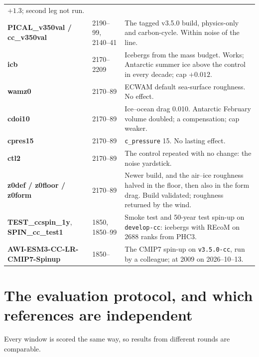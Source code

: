 \documentclass[10pt]{article}
\begin{document}
{\begin{longtable}{p{3.3cm}p{2.3cm}p{10.2cm}}
$+1.3$; second leg not run. \\
\textbf{PICAL\_v350val / cc\_v350val} & 2190--99, 2140--41 & The tagged v3.5.0 build, physics-only and
carbon-cycle. Within noise of the line. \\
\addlinespace
\textbf{icb}             & 2170--2209 & Icebergs from the mass budget. Works; Antarctic summer ice above
the control in every decade; cap $+0.012$. \\
\textbf{wamz0}           & 2170--89 & ECWAM default sea-surface roughness. No effect. \\
\textbf{cdoi10}          & 2170--89 & Ice--ocean drag 0.010. Antarctic February volume doubled; a
compensation; cap weaker. \\
\textbf{cpres15}         & 2170--89 & \texttt{c\_pressure} 15. No lasting effect. \\
\textbf{ctl2}            & 2170--89 & The control repeated with no change: the noise yardstick. \\
\textbf{z0def / z0floor / z0form} & 2170--89 & Newer build, and the air--ice roughness halved in the
floor, then also in the form drag. Build validated; roughness returned by the wind. \\
\addlinespace
\textbf{TEST\_ccspin\_1y}, \textbf{SPIN\_cc\_test1} & 1850, 1850--99 & Smoke test and 50-year test spin-up on
\texttt{develop-cc}: icebergs with REcoM on 2688 ranks from PHC3. \\
\textbf{AWI-ESM3-CC-LR-CMIP7-Spinup} & 1850-- & The CMIP7 spin-up on \texttt{v3.5.0-cc}, run by a colleague;
at 2009 on 2026--10--13. \\
\bottomrule
\end{longtable}}

\section{The evaluation protocol, and which references are independent}\label{sec:eval}

Every window is scored the same way, so results from different rounds are comparable.
\end{document}
